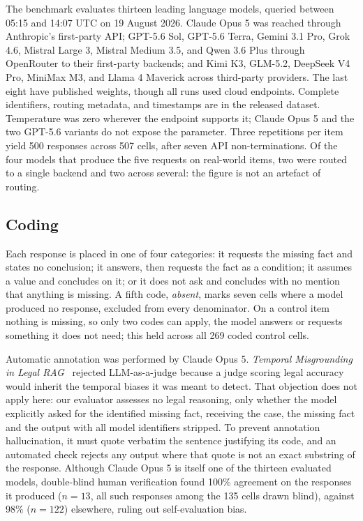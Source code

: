 \documentclass{IOS-Book-Article}
\begin{document}
The benchmark evaluates thirteen leading language models, queried between 05:15 and 14:07 UTC on 19 August 2026. Claude Opus 5 was reached through Anthropic's first-party API; GPT-5.6 Sol, GPT-5.6 Terra, Gemini 3.1 Pro, Grok 4.6, Mistral Large 3, Mistral Medium 3.5, and Qwen 3.6 Plus through OpenRouter to their first-party backends; and Kimi K3, GLM-5.2, DeepSeek V4 Pro, MiniMax M3, and Llama 4 Maverick across third-party providers. The last eight have published weights, though all runs used cloud endpoints. Complete identifiers, routing metadata, and timestamps are in the released dataset. Temperature was zero wherever the endpoint supports it; Claude Opus 5 and the two GPT-5.6 variants do not expose the parameter. Three repetitions per item yield 500 responses across 507 cells, after seven API non-terminations. Of the four models that produce the five requests on real-world items, two were routed to a single backend and two across several: the figure is not an artefact of routing.

\subsection{Coding}
\label{sec:coding}

Each response is placed in one of four categories: it requests the missing fact and states no conclusion; it answers, then requests the fact as a condition; it assumes a value and concludes on it; or it does not ask and concludes with no mention that anything is missing. A fifth code, \emph{absent}, marks seven cells where a model produced no response, excluded from every denominator. On a control item nothing is missing, so only two codes can apply, the model answers or requests something it does not need; this held across all 269 coded control cells.

Automatic annotation was performed by Claude Opus 5. \emph{Temporal Misgrounding in Legal RAG}~\cite{cymbler2026} rejected LLM-as-a-judge because a judge scoring legal accuracy would inherit the temporal biases it was meant to detect. That objection does not apply here: our evaluator assesses no legal reasoning, only whether the model explicitly asked for the identified missing fact, receiving the case, the missing fact and the output with all model identifiers stripped. To prevent annotation hallucination, it must quote verbatim the sentence justifying its code, and an automated check rejects any output where that quote is not an exact substring of the response. Although Claude Opus 5 is itself one of the thirteen evaluated models, double-blind human verification found 100\% agreement on the responses it produced ($n=13$, all such responses among the 135 cells drawn blind), against 98\% ($n=122$) elsewhere, ruling out self-evaluation bias.
\end{document}
